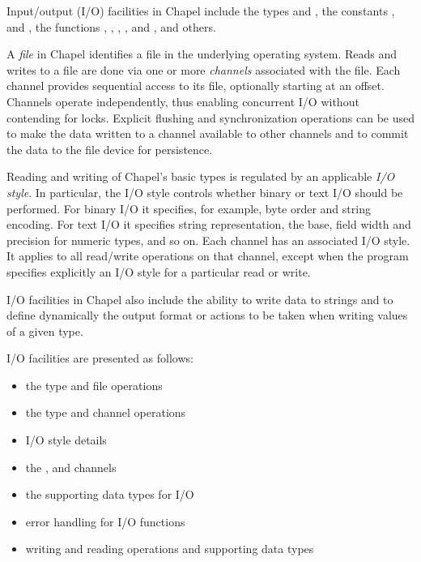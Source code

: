 \label{Input_and_Output}

Input/output (I/O) facilities in Chapel include
the types  and ,
the constants ,  and ,
the functions , , , ,
 and ,
and others.

A \emph{file} in Chapel identifies a file in the underlying operating system.
%
Reads and writes to a file are done via one or more \emph{channels}
associated with the file.
Each channel provides sequential access to its file, optionally
starting at an offset. Channels operate independently,
thus enabling concurrent I/O without contending for locks.
%
Explicit flushing and synchronization operations can be used
to make the data written to a channel available to other channels
and to commit the data to the file device for persistence.

Reading and writing of Chapel's basic types is regulated by
an applicable \emph{I/O style}.
In particular, the I/O style controls whether binary or text I/O
should be performed. For binary I/O it specifies, for example, byte order
and string encoding. For text I/O it specifies string representation,
the base, field width and precision for numeric types, and so on.
Each channel has an associated I/O style. It applies to
all read/write operations on that channel, except when the program
specifies explicitly an I/O style for a particular read or write.

I/O facilities in Chapel also include the ability to write data
to strings and to define dynamically the output format or actions
to be taken when writing values of a given type.

I/O facilities are presented as follows:

\begin{itemize}

\item the  type and file operations

\item the  type and channel operations

\item I/O style details

\item the ,  and  channels

\item the supporting data types for I/O

\item error handling for I/O functions

\item writing and reading operations and supporting data types

\end{itemize}


